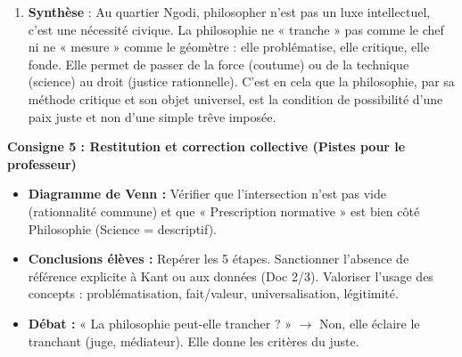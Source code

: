 \documentclass[11pt]{article}
\newcommand{\cle}[1]{{\popxbold\color{popdark}#1}}
\begin{document}
\begin{exoresolu}
\begin{enumerate}
    \item \textbf{Synthèse} : Au quartier Ngodi, philosopher n'est pas un luxe intellectuel, c'est une \cle{nécessité civique}. La philosophie ne « tranche » pas comme le chef ni ne « mesure » comme le géomètre : elle \cle{problématise}, elle \cle{critique}, elle \cle{fonde}. Elle permet de passer de la \cle{force} (coutume) ou de la \cle{technique} (science) au \cle{droit} (justice rationnelle). C'est en cela que la philosophie, par sa méthode critique et son objet universel, est la condition de possibilité d'une \cle{paix juste} et non d'une simple \cle{trêve} imposée.
\end{enumerate}

\textbf{Consigne 5 : Restitution et correction collective (Pistes pour le professeur)}
\begin{itemize}
    \item \textbf{Diagramme de Venn :} Vérifier que l'intersection n'est pas vide (rationnalité commune) et que « Prescription normative » est bien côté Philosophie (Science = descriptif).
    \item \textbf{Conclusions élèves :} Repérer les 5 étapes. Sanctionner l'absence de référence explicite à Kant ou aux données (Doc 2/3). Valoriser l'usage des concepts : \cle{problématisation}, \cle{fait/valeur}, \cle{universalisation}, \cle{légitimité}.
    \item \textbf{Débat :} « La philosophie peut-elle trancher ? » $\to$ Non, elle \cle{éclaire} le tranchant (juge, médiateur). Elle donne les \cle{critères} du juste.
\end{itemize}
\end{exoresolu}
\end{document}
